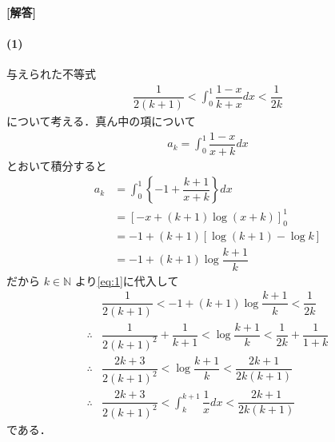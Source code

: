 \documentclass[../../main.tex]{subfiles}
\begin{document}
\begin{oframed}
  
\end{oframed}

{\bf [解答]}

\paragraph{(1)}

与えられた不等式
\begin{align}
  \dfrac{1}{2(k+1)}<\int_0^1\dfrac{1-x}{k+x}dx<\dfrac{1}{2k} \label{eq:1}
\end{align}
について考える．真ん中の項について
\begin{align}
  a_k = \int_{0}^{1} \dfrac{1-x}{x+k} dx \label{eq:2}
\end{align}
とおいて積分すると
\begin{align}
  a_k
  &= \int_{0}^{1} \left\{ -1 + \dfrac{k+1}{x+k} \right\} dx \\
  &= \left[ -x + (k+1)\log(x+k) \right]_{0}^{1} \\
  &= -1 + (k+1)\left[\log\left(k+1\right)-\log k \right] \\
  &= -1 + (k+1)\log\dfrac{k+1}{k}
\end{align}
だから $k \in \mathbb{N}$ より\cref{eq:1}に代入して
\begin{align}
  & \dfrac{1}{2(k+1)} < -1 + (k+1)\log\dfrac{k+1}{k} < \dfrac{1}{2k} \\
  \therefore
  & \dfrac{1}{2(k+1)^2}+\dfrac{1}{k+1} <  \log\dfrac{k+1}{k} < \dfrac{1}{2k}+\dfrac{1}{1+k} \label{eq:3}\\
  \therefore
  & \dfrac{2k+3}{2(k+1)^2} < \log\dfrac{k+1}{k} < \dfrac{2k+1}{2k(k+1)} \\
  \therefore
  & \dfrac{2k+3}{2(k+1)^2} < \int_{k}^{k+1} \dfrac{1}{x} dx < \dfrac{2k+1}{2k(k+1)} \label{eq:4}
\end{align}
である．
\end{document}
